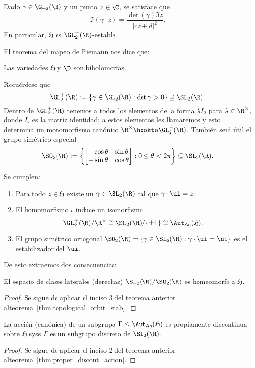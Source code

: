 \documentclass[teoria-numeros.tex]{subfiles}
\begin{document}
\addtocounter{thmi}{1}
\begin{slem}
	Dado $\gamma \in \GL_2(\R)$ y un punto $z \in \C$, se satisface que
	\begin{equation}
		\Im(\gamma\cdot z) = \frac{\det(\gamma)\Im z}{|cz + d|^2}.
		\label{eqn:im_part_of_gl2_act}
	\end{equation}
	En particular, $\mathfrak{H}$ es $\GL_2^+(\R)$-estable.
\end{slem}

El teorema del mapeo de Riemann nos dice que:
\begin{slem}
	Las variedades $\mathfrak{H}$ y $\D$ son biholomorfas.
\end{slem}
\addtocounter{thmi}{-1}
Recuérdese que
\[
	\GL_2^+(\R) := \{ \gamma \in \GL_2(\R) : \det\gamma > 0 \} \supseteq \SL_2(\R).
\]
Dentro de $\GL_2^+(\R)$ tenemos a todos los elementos de la forma $\lambda I_2$ para $\lambda \in \R^\times$, donde $I_2$ es la matriz identidad;
a estos elementos les llamaremos 
y esto determina un monomorfismo canónico $\R^\times \hookto \GL_2^+(\R)$.
También será útil el grupo simétrico especial
\[
	\SO_2(\R) := \left\{ 
		\begin{bmatrix}
			\phantom{-}\cos\theta & \sin\theta \\
			-\sin\theta & \cos\theta
		\end{bmatrix}
		: 0 \le \theta < 2\pi
	\right\} \subseteq \SL_2(\R).
\]

\begin{thm}
	Se cumplen:
	\begin{enumerate}
		\item Para todo $z \in \mathfrak{H}$ existe un $\gamma \in \SL_2(\R)$ tal que $\gamma\cdot\ui = z$.
		\item El homomorfismo $\iota$ induce un isomorfismo
			\[
				\GL_2^+(\R) / \R^\times \cong \SL_2(\R) / \{ \pm 1 \} \cong \Aut_{\mathsf{An}}(\mathfrak{H}).
			\]
		\item El grupo simétrico ortogonal $\SO_2(\R) = \{ \gamma \in \SL_2(\R) : \gamma\cdot\ui = \ui \}$ es el estabilizador del $\ui$.
	\end{enumerate}
\end{thm}
De esto extraemos dos consecuencias:
\begin{cor}
	El espacio de clases laterales (derechas) $\SL_2(\R)/\SO_2(\R)$ es homeomorfo a $\mathfrak{H}$.
\end{cor}
\begin{proof}
	Se sigue de aplicar el inciso 3 del teorema anterior al\break teorema~\ref{thm:topological_orbit_stab}.
\end{proof}
\begin{cor}
	La acción (canónica) de un subgrupo $\Gamma \le \Aut_{\mathsf{An}}(\mathfrak{H})$ es propiamente discontinua sobre $\mathfrak{H}$
	syss $\Gamma$ es un subgrupo discreto de $\SL_2(\R)$.
\end{cor}
\begin{proof}
	Se sigue de aplicar el inciso 2 del teorema anterior al\break teorema~\ref{thm:proper_discont_action}.
\end{proof}
\end{document}
